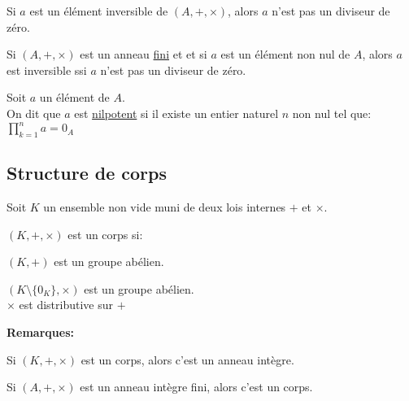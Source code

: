 \documentclass[12pt,twoside,a4paper]{article}
\begin{document}
			\begin{prop}
				\begin{liste}
					\item Si $a$ est un \'el\'ement inversible de $(A,+,\times)$, alors $a$ n'est pas un diviseur de z\'ero.
					\item Si $(A,+,\times)$ est un anneau \underline{fini} et et si $a$ est un \'el\'ement non nul de $A$, alors $a$ est inversible ssi $a$ n'est pas un diviseur de z\'ero.
				\end{liste}
			\end{prop}
			\begin{defi}
				Soit $a$ un \'el\'ement de $A$.\\
				On dit que $a$ est \underline{nilpotent} si il existe un entier naturel $n$ non nul tel que:
				$\prod\limits_{k=1}^na=0_A$
			\end{defi}
		\subsection{Structure de corps}
			\begin{flushleft}
				Soit $K$ un ensemble non vide muni de deux lois internes $+$ et $\times$.
			\end{flushleft}
			\begin{defi}
				$(K,+,\times)$ est un corps si:
				\begin{liste}
					\item[\cercle1]$(K,+)$ est un groupe ab\'elien.
					\item[\cercle2]$(K\setminus\{0_K\},\times)$ est un groupe ab\'elien.\\
						$\times$ est distributive sur $+$
				\end{liste}
			\end{defi}
			\begin{flushleft}
				\textbf{Remarques:}
				\begin{liste}
					\item Si $(K,+,\times)$ est un corps, alors c'est un anneau int\`egre.
					\item Si $(A,+,\times)$ est un anneau int\`egre fini, alors c'est un corps.
				\end{liste}
			\end{flushleft}
\end{document}
